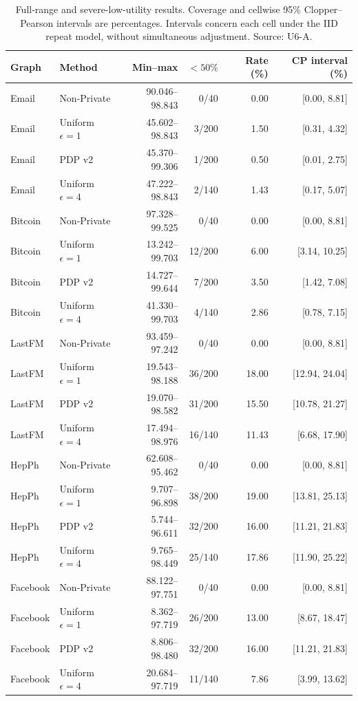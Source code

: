 \begin{table}[htbp]
\centering\small
\caption{Full-range and severe-low-utility results. Coverage and cellwise 95\% Clopper--Pearson intervals are percentages. Intervals concern each cell under the IID repeat model, without simultaneous adjustment. Source: U6-A.}\label{tab:low}
\begin{tabular}{llrrrr}
\toprule
Graph & Method & Min--max & $<50\%$ & Rate (\%) & CP interval (\%)\\ \midrule
Email & Non-Private & 90.046--98.843 & 0/40 & 0.00 & [0.00, 8.81] \\
Email & Uniform $\epsilon=1$ & 45.602--98.843 & 3/200 & 1.50 & [0.31, 4.32] \\
Email & PDP v2 & 45.370--99.306 & 1/200 & 0.50 & [0.01, 2.75] \\
Email & Uniform $\epsilon=4$ & 47.222--98.843 & 2/140 & 1.43 & [0.17, 5.07] \\
Bitcoin & Non-Private & 97.328--99.525 & 0/40 & 0.00 & [0.00, 8.81] \\
Bitcoin & Uniform $\epsilon=1$ & 13.242--99.703 & 12/200 & 6.00 & [3.14, 10.25] \\
Bitcoin & PDP v2 & 14.727--99.644 & 7/200 & 3.50 & [1.42, 7.08] \\
Bitcoin & Uniform $\epsilon=4$ & 41.330--99.703 & 4/140 & 2.86 & [0.78, 7.15] \\
LastFM & Non-Private & 93.459--97.242 & 0/40 & 0.00 & [0.00, 8.81] \\
LastFM & Uniform $\epsilon=1$ & 19.543--98.188 & 36/200 & 18.00 & [12.94, 24.04] \\
LastFM & PDP v2 & 19.070--98.582 & 31/200 & 15.50 & [10.78, 21.27] \\
LastFM & Uniform $\epsilon=4$ & 17.494--98.976 & 16/140 & 11.43 & [6.68, 17.90] \\
HepPh & Non-Private & 62.608--95.462 & 0/40 & 0.00 & [0.00, 8.81] \\
HepPh & Uniform $\epsilon=1$ & 9.707--96.898 & 38/200 & 19.00 & [13.81, 25.13] \\
HepPh & PDP v2 & 5.744--96.611 & 32/200 & 16.00 & [11.21, 21.83] \\
HepPh & Uniform $\epsilon=4$ & 9.765--98.449 & 25/140 & 17.86 & [11.90, 25.22] \\
Facebook & Non-Private & 88.122--97.751 & 0/40 & 0.00 & [0.00, 8.81] \\
Facebook & Uniform $\epsilon=1$ & 8.362--97.719 & 26/200 & 13.00 & [8.67, 18.47] \\
Facebook & PDP v2 & 8.806--98.480 & 32/200 & 16.00 & [11.21, 21.83] \\
Facebook & Uniform $\epsilon=4$ & 20.684--97.719 & 11/140 & 7.86 & [3.99, 13.62] \\
\bottomrule\end{tabular}
\end{table}
